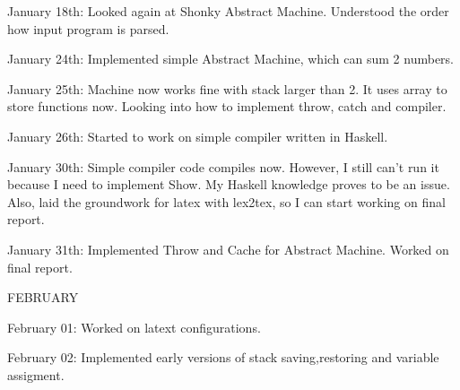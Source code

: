 \documentclass[12pt]{report}
\begin{document}
January 18th: Looked again at Shonky Abstract Machine. Understood the order how
input program is parsed.

January 24th: Implemented simple Abstract Machine, which can sum 2 numbers.

January 25th: Machine now works fine with stack larger than 2. It uses array to
store functions now. Looking into how to implement throw, catch and compiler.

January 26th: Started to work on simple compiler written in Haskell.

January 30th: Simple compiler code compiles now. However, I still can't run it
because I need to implement Show. My Haskell knowledge proves to be an issue.
Also, laid the groundwork for latex with lex2tex, so I can start working on final
report.

January 31th: Implemented Throw and Cache for Abstract Machine. Worked on final
report. 

FEBRUARY 

February 01: Worked on latext configurations.

February 02: Implemented early versions of stack saving,restoring and variable
assigment. 
\end{document}
